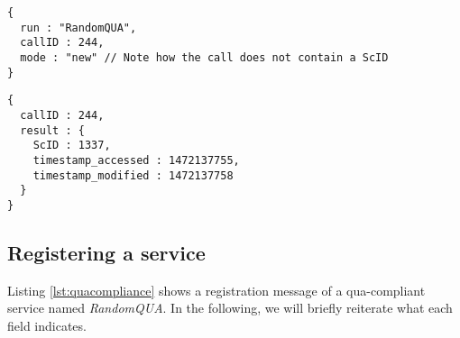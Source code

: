 \begin{lstlisting}[caption={A qua-compliant service run request for mode \texttt{new}}, label={lst:quacompliantinput:new}]
{
  run : "RandomQUA",
  callID : 244,
  mode : "new" // Note how the call does not contain a ScID
}
\end{lstlisting}

\begin{lstlisting}[caption={A qua-compliant service output for mode \texttt{new}}, label={lst:quacompliantresult:new}]
{
  callID : 244,
  result : {
    ScID : 1337,
    timestamp_accessed : 1472137755,
    timestamp_modified : 1472137758
  }
}
\end{lstlisting}

\subsection{Registering a service}

Listing \ref{lst:quacompliance} shows a registration message of a qua-compliant service named \emph{RandomQUA}. In the following, we will briefly reiterate what each field indicates.

